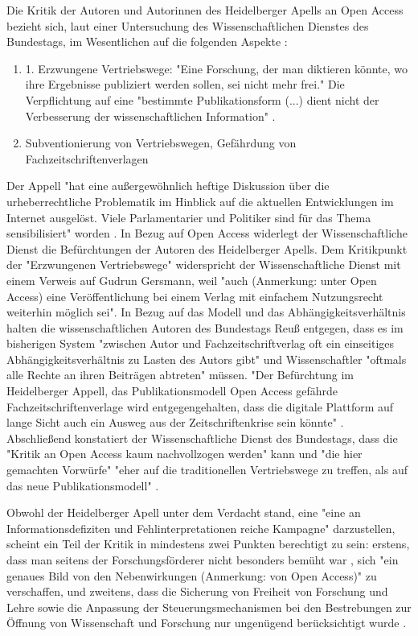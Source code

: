 Die Kritik der Autoren und Autorinnen des Heidelberger Apells an Open Access bezieht sich, laut einer Untersuchung des Wissenschaftlichen Dienstes des Bundestags, im Wesentlichen auf die folgenden Aspekte \cite{WD_bundestag_2009}:
\begin{enumerate}
\item 1.	Erzwungene Vertriebswege: "Eine Forschung, der man diktieren könnte, wo ihre Ergebnisse publiziert werden sollen, sei nicht mehr frei." Die Verpflichtung auf eine "bestimmte Publikationsform (...) dient nicht der Verbesserung der wissenschaftlichen Information" \cite{ITK_2009}.
\item Subventionierung von Vertriebswegen, Gefährdung von Fachzeitschriftenverlagen \cite{ITK_2009}
\end{enumerate}

Der Appell "hat eine außergewöhnlich heftige Diskussion über die urheberrechtliche Problematik im Hinblick auf die aktuellen Entwicklungen im Internet ausgelöst. Viele Parlamentarier und Politiker sind für das Thema sensibilisiert" worden \cite{WD_bundestag_2009}. In Bezug auf Open Access widerlegt der Wissenschaftliche Dienst die Befürchtungen der Autoren des Heidelberger Apells. Dem Kritikpunkt der "Erzwungenen Vertriebswege" widerspricht der Wissenschaftliche Dienst mit einem Verweis auf Gudrun Gersmann, weil "auch (Anmerkung: unter Open Access) eine Veröffentlichung bei einem Verlag mit einfachem Nutzungsrecht weiterhin möglich sei". In Bezug auf das Modell und das Abhängigkeitsverhältnis halten die wissenschaftlichen Autoren des Bundestags Reuß entgegen, dass es im bisherigen System "zwischen Autor und Fachzeitschriftverlag oft ein einseitiges Abhängigkeitsverhältnis zu Lasten des Autors gibt" und Wissenschaftler "oftmals alle Rechte an ihren Beiträgen abtreten" \cite{WD_bundestag_2009} müssen. "Der Befürchtung im Heidelberger Appell, das Publikationsmodell Open Access gefährde Fachzeitschriftenverlage wird entgegengehalten, dass die digitale Plattform auf lange Sicht auch ein Ausweg aus der Zeitschriftenkrise sein könnte" \cite{WD_bundestag_2009}. Abschließend konstatiert der Wissenschaftliche Dienst des Bundestags, dass die "Kritik an Open Access kaum nachvollzogen werden" kann und "die hier gemachten Vorwürfe" "eher auf die traditionellen Vertriebswege zu treffen, als auf das neue Publikationsmodell" \cite{WD_bundestag_2009}.

Obwohl der Heidelberger Apell unter dem Verdacht stand, eine "eine an Informationsdefiziten und Fehlinterpretationen reiche Kampagne" \cite{Schmidt_2009} darzustellen, scheint ein Teil der Kritik in mindestens zwei Punkten berechtigt zu sein: erstens, dass man seitens der Forschungsförderer nicht besonders bemüht war \cite{faz_heidelberger_apell_2009}, sich "ein genaues Bild von den Nebenwirkungen (Anmerkung: von Open Access)" \cite{Reuss_2009} zu verschaffen, und zweitens, dass die Sicherung von Freiheit von Forschung und Lehre sowie die Anpassung der Steuerungsmechanismen bei den Bestrebungen zur Öffnung von Wissenschaft und Forschung nur ungenügend berücksichtigt wurde \cite{hagner_2015_sache_buches}.

